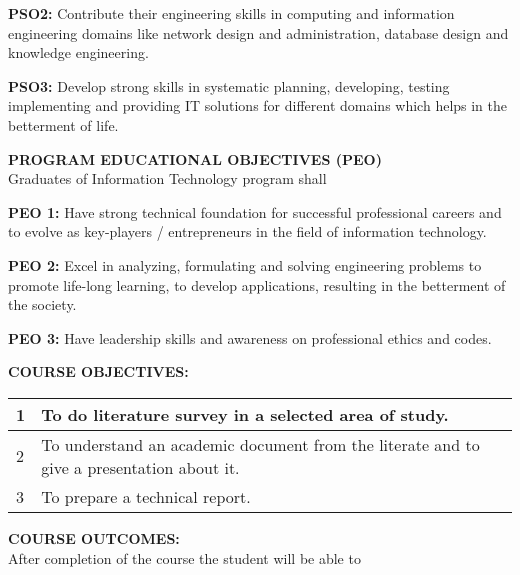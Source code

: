 \textbf{PSO2:} Contribute their engineering skills in computing and information engineering domains like network design and administration, database design and knowledge engineering.
\par\noindent
\textbf{PSO3:} Develop strong skills in systematic planning, developing, testing implementing and providing IT solutions for different domains which helps in the betterment of life.
\par\noindent
\textbf{PROGRAM EDUCATIONAL OBJECTIVES (PEO)}\\\noindent
Graduates of Information Technology program shall
\par\noindent
\textbf{PEO 1:} Have strong technical foundation for successful professional careers and to evolve as key-players / entrepreneurs in the field of information technology.
\par\noindent
\textbf{PEO 2:} Excel in analyzing, formulating and solving engineering problems to promote life-long learning, to develop applications, resulting in the betterment of the society.
\par\noindent
\textbf{PEO 3:} Have leadership skills and awareness on professional ethics and codes.
\par\noindent
\renewcommand{\arraystretch}{2}
\textbf{COURSE OBJECTIVES:}
\vspace{3mm}
\begin{center}
\begin{tabular}{|m{2em}|m{35em}|}
\hline
1 & To do literature survey in a selected area of study.\\
\hline
2 & To understand an academic document from the literate and to give a presentation about it.\\
\hline
3 & To prepare a technical report.\\
\hline
\end{tabular}
\end{center}
\par \noindent
\textbf{COURSE OUTCOMES:}\\
After completion of the course the student will be able to
\vspace{3mm}

